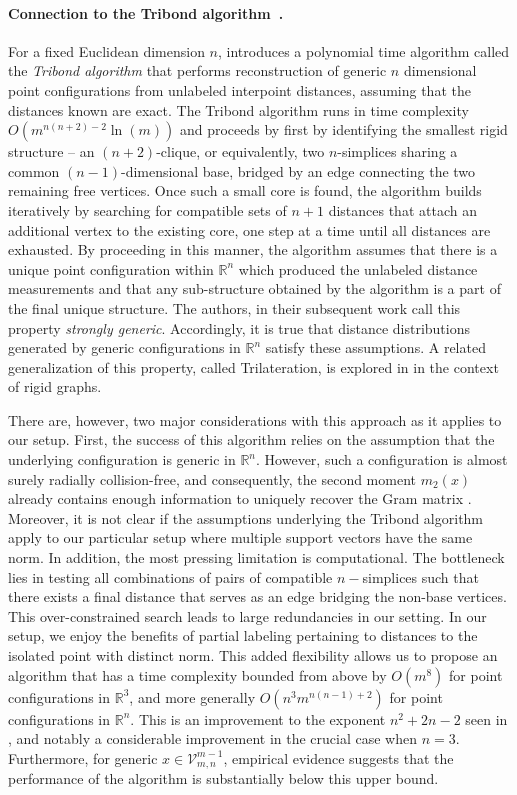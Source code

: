 \documentclass{article}
\theoremstyle{definition}
\renewcommand{\r}{\mathbb{R}}
\renewcommand{\|}{|}
\newcommand{\V}{\mathcal{V}}
\begin{document}
\paragraph{{\bf Connection to the Tribond algorithm~\cite{duxbury2016unassigned}.}}
For a fixed Euclidean dimension $n$, \cite[Theorem 4]{duxbury2016unassigned} introduces a polynomial time algorithm called the \textit{Tribond algorithm} that performs reconstruction of generic $n$ dimensional point configurations from unlabeled interpoint distances, assuming that the distances known are exact. The Tribond algorithm runs in time complexity $O(m^{n(n+2)-2}\ln(m))$ and proceeds by first by identifying the smallest rigid structure -- an $(n+2)$-clique, or equivalently, two $n$-simplices sharing a common $(n-1)$-dimensional base, bridged by an edge connecting the two remaining free vertices. Once such a small core is found, the algorithm builds iteratively by searching for compatible sets of $n+1$ distances that attach an additional vertex to the existing core, one step at a time until all distances are exhausted. By proceeding in this manner, the algorithm assumes that there is a unique point configuration within $\r^n$ which produced the unlabeled distance measurements and that any sub-structure obtained by the algorithm is a part of the final unique structure. The authors, in their subsequent work \cite{Billinge2016Assigned} call this property \textit{strongly generic}. Accordingly, it is true that distance distributions generated by generic configurations in $\r^n$ satisfy these assumptions. A related generalization of this property, called Trilateration, is explored in \cite{gkioulekas2024trilateration} in the context of rigid graphs. 

There are, however, two major considerations with this approach as it applies to our setup. First, the success of this algorithm relies on the assumption that the underlying configuration is generic in $\mathbb{R}^n$. However, such a configuration is almost surely radially collision-free, and consequently, the second moment $m_2(x)$ already contains enough information to uniquely recover the Gram matrix \cite[Theorem 3.1]{bendory2024beltway}. Moreover, it is not clear if the assumptions underlying the Tribond algorithm apply to our particular setup where multiple support vectors have the same norm. In addition, the most pressing limitation is computational. The bottleneck lies in testing all combinations of pairs of compatible $n-$simplices such that there exists a final distance that serves as an edge bridging the non-base vertices. This over-constrained search leads to large redundancies in our setting. In our setup, we enjoy the benefits of partial labeling pertaining to distances to the isolated point with distinct norm. This added flexibility allows us to propose an algorithm that has a time complexity bounded from above by $O(m^{8})$ for point configurations in $\r^3$, and more generally $O(n^3m^{n(n-1)+2})$ for point configurations in $\r^n$. This is an improvement to the exponent $n^2+2n-2$ seen in \cite{duxbury2016unassigned}, and notably a considerable improvement in the crucial case when $n=3$. Furthermore, for generic $x\in \V^{m-1}_{m,n}$, empirical evidence suggests that the performance of the algorithm is substantially below this upper bound.
\end{document}
